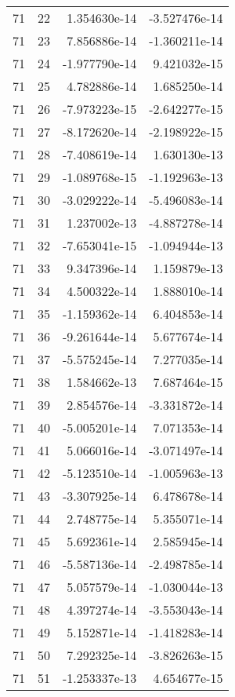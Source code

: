 \begin{tabular}{rrrr}
  71 &   22 &  1.354630e-14 & -3.527476e-14 \\
  71 &   23 &  7.856886e-14 & -1.360211e-14 \\
  71 &   24 & -1.977790e-14 &  9.421032e-15 \\
  71 &   25 &  4.782886e-14 &  1.685250e-14 \\
  71 &   26 & -7.973223e-15 & -2.642277e-15 \\
  71 &   27 & -8.172620e-14 & -2.198922e-15 \\
  71 &   28 & -7.408619e-14 &  1.630130e-13 \\
  71 &   29 & -1.089768e-15 & -1.192963e-13 \\
  71 &   30 & -3.029222e-14 & -5.496083e-14 \\
  71 &   31 &  1.237002e-13 & -4.887278e-14 \\
  71 &   32 & -7.653041e-15 & -1.094944e-13 \\
  71 &   33 &  9.347396e-14 &  1.159879e-13 \\
  71 &   34 &  4.500322e-14 &  1.888010e-14 \\
  71 &   35 & -1.159362e-14 &  6.404853e-14 \\
  71 &   36 & -9.261644e-14 &  5.677674e-14 \\
  71 &   37 & -5.575245e-14 &  7.277035e-14 \\
  71 &   38 &  1.584662e-13 &  7.687464e-15 \\
  71 &   39 &  2.854576e-14 & -3.331872e-14 \\
  71 &   40 & -5.005201e-14 &  7.071353e-14 \\
  71 &   41 &  5.066016e-14 & -3.071497e-14 \\
  71 &   42 & -5.123510e-14 & -1.005963e-13 \\
  71 &   43 & -3.307925e-14 &  6.478678e-14 \\
  71 &   44 &  2.748775e-14 &  5.355071e-14 \\
  71 &   45 &  5.692361e-14 &  2.585945e-14 \\
  71 &   46 & -5.587136e-14 & -2.498785e-14 \\
  71 &   47 &  5.057579e-14 & -1.030044e-13 \\
  71 &   48 &  4.397274e-14 & -3.553043e-14 \\
  71 &   49 &  5.152871e-14 & -1.418283e-14 \\
  71 &   50 &  7.292325e-14 & -3.826263e-15 \\
  71 &   51 & -1.253337e-13 &  4.654677e-15 \\

\end{tabular}
